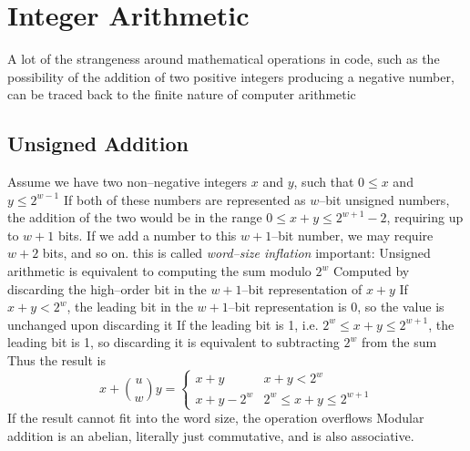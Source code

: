 \documentclass[../bryant_comp_sys.tex]{subfiles}
\begin{document}
            \section{Integer Arithmetic}
                \begin{outline}
                    \1 A lot of the strangeness around mathematical operations in code, such as the possibility of the addition of two positive integers producing a negative number, can be traced back to the finite nature of computer arithmetic
                \end{outline}

                \subsection{Unsigned Addition}
                    \begin{outline}
                        \1 Assume we have two non--negative integers \( x \) and \( y \), such that \( 0 \leq x \) and \( y \leq 2^{w-1} \)
                            \2 If both of these numbers are represented as \( w \)--bit unsigned numbers, the addition of the two would be in the range \( 0 \leq x + y \leq 2^{w+1} - 2 \), requiring up to \( w+1 \) bits.
                            \2 If we add a number to this \( w+1 \)--bit number, we may require \( w+2 \) bits, and so on. this is called \textit{word--size inflation}
                        \1 \alert{important}: Unsigned arithmetic is equivalent to computing the sum modulo \( 2^w \)
                            \2 Computed by discarding the high--order bit in the \( w+1 \)--bit representation of \( x+y \)
                            \2 If \( x+y < 2^w \), the leading bit in the \( w+1 \)--bit representation is 0, so the value is unchanged upon discarding it
                            \2 If the leading bit is 1, i.e. \( 2^w \leq x+y \leq 2^{w+1} \), the leading bit is 1, so discarding it is equivalent to subtracting \( 2^w \) from the sum
                            \2 Thus the result is
                            \[
                                x + \binom{u}{w}y = \begin{cases} x+y & x + y < 2^w \\ x + y-2^w & 2^w \leq x + y \leq 2^{w+1} \end{cases} 
                            \]
                            \2 If the result cannot fit into the word size, the operation \glspl{overflow}
                        \1 Modular addition is an \gls{abelian}, literally just commutative, and is also associative.
                    \end{outline}
\end{document}
